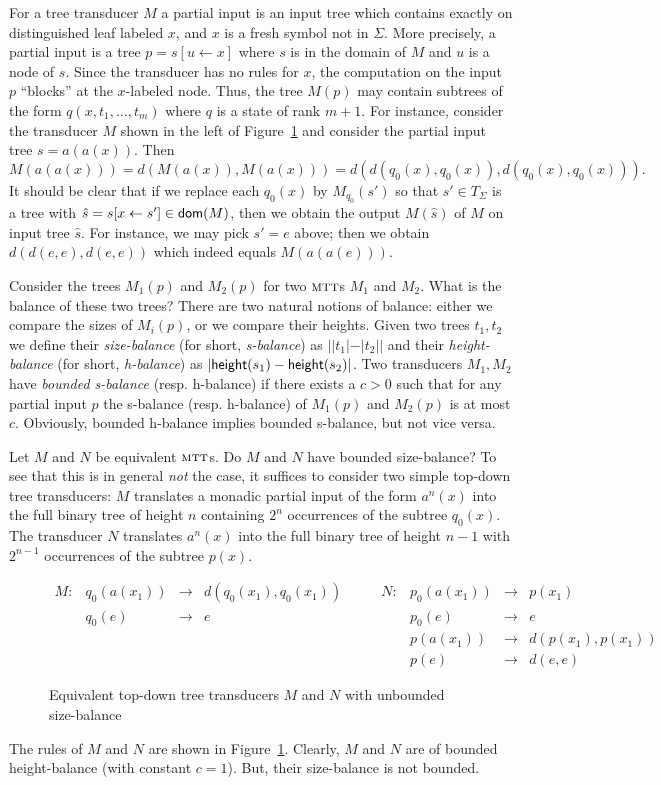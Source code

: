 \documentclass[copyright,creativecommons]{eptcs}
\newcommand{\height}[1]{{\sf height}(#1)}
\newcommand{\dom}[1]{{\sf dom}(#1)}
\newcommand{\mtt}{\textsc{mtt}}
\begin{document}
For a tree transducer $M$ a partial input is an input tree which contains
exactly on distinguished leaf labeled $x$, and $x$ is a fresh symbol
not in $\Sigma$. More precisely, a partial input is a tree
$p=s[u\leftarrow x]$ where $s$ is in the domain of $M$ and $u$ is a node of $s$.
Since the transducer has no rules for $x$, the computation on the
input $p$ ``blocks'' at the $x$-labeled node. Thus, the tree $M(p)$
may contain subtrees of the form $q(x,t_1,\dots,t_m)$ where $q$ is a
state of rank $m+1$. 
For instance, consider the transducer $M$ shown in the left of
Figure~\ref{fig:MN} and consider the partial input tree
$s=a(a(x))$. Then
\[
M(a(a(x))) = d(M(a(x)), M(a(x))) = d(d(q_0(x),q_0(x)), d(q_0(x),q_0(x))).
\]
It should be clear that if we replace each $q_0(x)$ by $M_{q_0}(s')$ so
that $s'\in T_\Sigma$ is a tree with $\hat{s}=s[x\leftarrow s']\in\dom{M}$,
then we obtain the output $M(\hat{s})$ of $M$ on input tree $\hat{s}$.
For instance, we may pick $s'=e$ above; then we obtain
$d(d(e,e),d(e,e))$ which indeed equals $M(a(a(e)))$.

Consider the trees $M_1(p)$ and $M_2(p)$ for two $\mtt$s $M_1$ and $M_2$.
What is the balance of these two trees?
There are two natural notions of balance: either we compare the 
sizes of $M_i(p)$, or we compare their heights.
Given two trees $t_1,t_2$ we define their \emph{size-balance} 
(for short, \emph{s-balance}) as $| |t_1| - |t_2| |$ and 
their \emph{height-balance} (for short, \emph{h-balance}) as
$| \height{s_1} - \height{s_2} |$.
Two transducers $M_1,M_2$ have \emph{bounded s-balance} (resp. h-balance)
if there exists a $c>0$ such that for any partial input $p$
the s-balance (resp. h-balance) of $M_1(p)$ and $M_2(p)$ is 
at most $c$.
Obviously, bounded h-balance implies bounded s-balance, but not vice versa.

Let $M$ and $N$ be equivalent $\mtt$s.
Do $M$ and $N$ have bounded size-balance?
To see that this is in general \emph{not} the case, it suffices to consider
two simple top-down tree transducers:
$M$ translates a monadic partial input of the form $a^n(x)$
into the full binary tree of height $n$ containing $2^n$
occurrences of the subtree $q_0(x)$. The transducer $N$ translates 
$a^n(x)$ into the full binary tree of height $n-1$ with
$2^{n-1}$ occurrences of the subtree $p(x)$.
\begin{figure}[htb]
\[
\begin{array}{llclllcl}
M:&q_0(a(x_1))&\to& d(q_0(x_1),q_0(x_1))\qquad &N:& p_0(a(x_1))&\to& p(x_1)\\
&q_0(e)&\to&e&& p_0(e)&\to&e\\
&&&&&p(a(x_1))&\to&d(p(x_1),p(x_1))\\
&&&&&p(e)&\to&d(e,e)
\end{array}
\]
\caption{Equivalent top-down tree transducers $M$ and $N$
with unbounded size-balance}\label{fig:MN}
\end{figure}
The rules of $M$ and $N$ are shown in Figure~\ref{fig:MN}.
Clearly, $M$ and $N$ are of bounded height-balance (with constant $c=1$).
But, their size-balance is not bounded.
\end{document}
